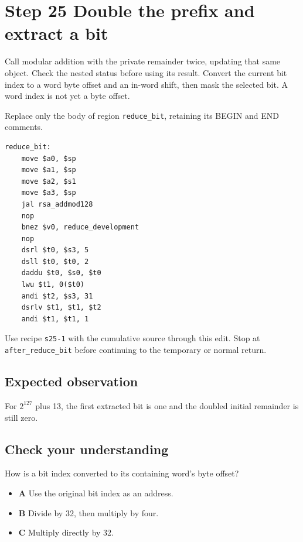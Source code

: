 \section{Step 25 Double the prefix and extract a bit}\label{rsa-s25}

Call modular addition with the private remainder twice, updating that same object. Check the nested status before using its result. Convert the current bit index to a word byte offset and an in-word shift, then mask the selected bit. A word index is not yet a byte offset.

Replace only the body of region \texttt{reduce\_bit}, retaining its BEGIN and END comments.

\begin{verbatim}
reduce_bit:
    move $a0, $sp
    move $a1, $sp
    move $a2, $s1
    move $a3, $sp
    jal rsa_addmod128
    nop
    bnez $v0, reduce_development
    nop
    dsrl $t0, $s3, 5
    dsll $t0, $t0, 2
    daddu $t0, $s0, $t0
    lwu $t1, 0($t0)
    andi $t2, $s3, 31
    dsrlv $t1, $t1, $t2
    andi $t1, $t1, 1
\end{verbatim}

Use recipe \texttt{s25-1} with the cumulative source through this edit. Stop at \texttt{after\_reduce\_bit} before continuing to the temporary or normal return.

\subsection{Expected observation}
For \(2^{127}\) plus 13, the first extracted bit is one and the doubled initial remainder is still zero.

\subsection{Check your understanding}
How is a bit index converted to its containing word's byte offset?

\begin{itemize}
  \item \textbf{A} Use the original bit index as an address.
  \item \textbf{B} Divide by 32, then multiply by four.
  \item \textbf{C} Multiply directly by 32.
\end{itemize}
